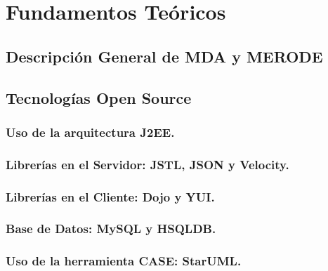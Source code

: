 \chapter{Fundamentos Te\'oricos}
\begin{indentar}
\end{indentar}

\section{Descripci\'on General de MDA y MERODE}
\begin{indentar}
\end{indentar}

\section{Tecnolog\'ias Open Source}
\begin{indentar}
\end{indentar}

\subsection{Uso de la arquitectura J2EE.}
\begin{indentar}
\end{indentar}

\subsection{Librer\'ias en el Servidor: JSTL, JSON y Velocity.}
\begin{indentar}
\end{indentar}

\subsection{Librer\'ias en el Cliente: Dojo y YUI.}
\begin{indentar}
\end{indentar}

\subsection{Base de Datos: MySQL y HSQLDB.}
\begin{indentar}
\end{indentar}

\subsection{Uso de la herramienta CASE: StarUML.}
\begin{indentar}
\end{indentar}